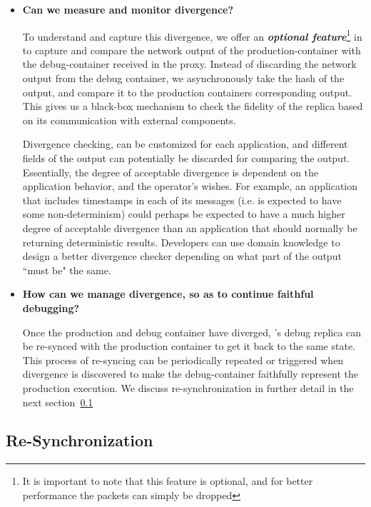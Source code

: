 \begin{itemize}
	\item \textbf{Can we measure and monitor divergence?}
	
	To understand and capture this divergence, we offer an \textbf{\emph{optional feature}}\footnote{It is important to note that this feature is optional, and for better performance the packets can simply be dropped} in \parikshan to capture and compare the network output  of the production-container with the debug-container received in the proxy.
	Instead of discarding the network output from the debug container, we asynchronously take the hash of the output, and compare it to the production containers corresponding output.
	This gives us a black-box mechanism to check the fidelity of the replica based on its communication with external components.
	
	Divergence checking, can be customized for each application, and different fields of the output can potentially be discarded for comparing the output.
	Essentially, the degree of acceptable divergence is dependent on the application behavior, and the operator's wishes. 
	For example, an application that includes timestamps in each of its messages (i.e. is expected to have some non-determinism) could perhaps be expected to have a much higher degree of acceptable divergence than an application that should normally be returning deterministic results.
	Developers can use domain knowledge to design a better divergence checker depending on what part of the output ``must be" the same.
		
	\item \textbf{How can we manage divergence, so as to continue faithful debugging?}
	
	Once the production and debug container have diverged, \parikshan's debug replica can be re-synced with the production container to get it back to the same state.
	This process of re-syncing can be periodically repeated or triggered when divergence is discovered to make the debug-container faithfully represent the production execution.
	We discuss re-synchronization in further detail in the next section~\ref{sec:periodicSynch}
	
\end{itemize}


\subsection{Re-Synchronization}
\label{sec:periodicSynch}

